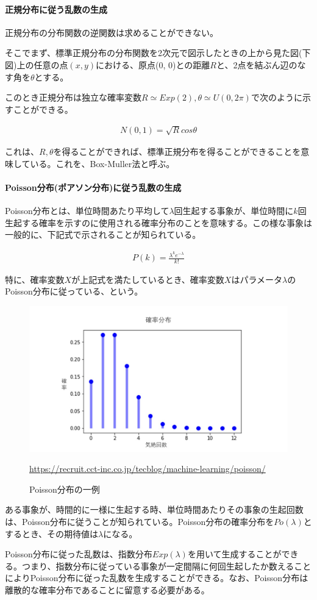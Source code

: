\documentclass[dvipdfmx]{jsarticle}
\begin{document}
\paragraph{正規分布に従う乱数の生成}
正規分布の分布関数の逆関数は求めることができない。\par
そこでまず、標準正規分布の分布関数を2次元で図示したときの上から見た図(下図)上の任意の点$(x,y)$における、原点(0, 0)との距離$R$と、2点を結ぶん辺のなす角を$\theta$とする。\par
このとき正規分布は独立な確率変数$R \simeq Exp(2), \theta \simeq U(0, 2\pi)$で次のように示すことができる。
\begin{center}
  \begin{align*}
    N(0, 1) = \sqrt{R}cos\theta
  \end{align*}
\end{center}
これは、$R, \theta$を得ることができれば、標準正規分布を得ることができることを意味している。これを、Box-Muller法と呼ぶ。
\paragraph{Poisson分布(ポアソン分布)に従う乱数の生成}
Poisson分布とは、単位時間あたり平均して$\lambda$回生起する事象が、単位時間に$k$回生起する確率を示すのに使用される確率分布のことを意味する。この様な事象は一般的に、下記式で示されることが知られている。
\begin{center}
  \begin{align*}
    P(k) = \frac{\lambda^{k}e^{-\lambda}}{k!}
  \end{align*}
\end{center}
特に、確率変数$X$が上記式を満たしているとき、確率変数$X$はパラメータ$\lambda$のPoisson分布に従っている、という。
\begin{figure}[H]
  \centering
  \includegraphics[scale=0.3]{poi_fig_1.jpg}
  \caption{Poisson分布の一例}
  \url{https://recruit.cct-inc.co.jp/tecblog/machine-learning/poisson/}
\end{figure}
ある事象が、時間的に一様に生起する時、単位時間あたりその事象の生起回数は、Poisson分布に従うことが知られている。Poisson分布の確率分布を$Po(\lambda)$とするとき、その期待値は$\lambda$になる。\par
Poisson分布に従った乱数は、指数分布$Exp(\lambda)$を用いて生成することができる。つまり、指数分布に従っている事象が一定間隔に何回生起したか数えることによりPoisson分布に従った乱数を生成することができる。なお、Poisson分布は離散的な確率分布であることに留意する必要がある。\par
\end{document}
